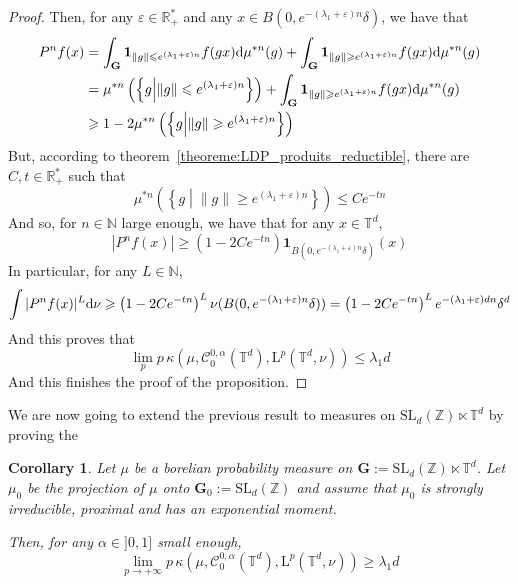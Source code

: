 \documentclass[11pt]{amsart}
\newtheorem{corollary}[theorem]{Corollary}
\theoremstyle{definition}
\theoremstyle{remark}
\numberwithin{equation}{section}
\begin{document}
\begin{proof}
Then, for any $\varepsilon \in {\mathbb R}_+^\ast$ and any $x\in B(0, e^{-(\lambda_1 +\varepsilon)n} \delta)$, we have that
\begin{align*}
P^n f(x) &= \int_{\mathbf G} {\mathbf{1}}_{\|g\|\leqslant e^{(\lambda_1 + \varepsilon)n}} f(gx) {{\rm d}}\mu^{\ast n}(g)+ \int_{\mathbf G} {\mathbf{1}}_{\|g\|\geqslant e^{(\lambda_1 + \varepsilon)n}} f(gx) {{\rm d}}\mu^{\ast n}(g) \\
&= \mu^{\ast n}\left(\left\{ g\middle| \|g\|\leqslant e^{(\lambda_1 + \varepsilon)n} \right\}\right) +  \int_{\mathbf G} {\mathbf{1}}_{\|g\|\geqslant e^{(\lambda_1 + \varepsilon)n}} f(gx) {{\rm d}}\mu^{\ast n}(g) \\
& \geqslant 1 - 2 \mu^{\ast n}\left(\left\{ g\middle| \|g\|\geqslant e^{(\lambda_1 + \varepsilon)n} \right\}\right)
\end{align*}
But, according to theorem~\ref{theoreme:LDP_produits_reductible}, there are $C,t\in {\mathbb R}_+^\ast$ such that
\[
\mu^{\ast n}\left(\left\{ g\middle| \|g\|\geqslant e^{(\lambda_1 + \varepsilon)n} \right\}\right) \leqslant Ce^{-tn}
\]
And so, for $n\in{\mathbb N}$ large enough, we have that for any $x\in {\mathbb T}^d$,
\[
|P^n f(x)| \geqslant \left(1-2Ce^{-tn}\right) {\mathbf{1}}_{B(0,e^{-(\lambda_1 + \varepsilon)n}\delta)}(x)
\]
In particular, for any $L\in {\mathbb N}$,
\[
\int |P^n f(x)|^L {{\rm d}}\nu \geqslant \left( 1-2Ce^{-tn} \right)^L \nu(B(0, e^{-(\lambda_1 + \varepsilon)n}\delta)) =  \left( 1-2Ce^{-tn} \right)^L e^{-(\lambda_1 + \varepsilon)dn} \delta^d
\]
And this proves that
\[
\lim_p  p\, \kappa\left(\mu,\mathcal{C}^{0,\alpha}_0\left({\mathbb T}^d\right), \mathrm{L}^p\left({\mathbb T}^d,\nu\right) \right) \leqslant \lambda_1 d
\]
And this finishes the proof of the proposition.
\end{proof}

We are now going to extend the previous result to measures on $\mathrm{SL}_d({\mathbb Z}) \ltimes {\mathbb T}^d$ by proving the
\begin{corollary}\label{coro:ts}
Let $\mu$ be a borelian probability measure on ${\mathbf G}:=\mathrm{SL}_d({\mathbb Z}) \ltimes {\mathbb T}^d$. Let $\mu_0$ be the projection of $\mu$ onto ${\mathbf G}_0:=\mathrm{SL}_d({\mathbb Z})$ and assume that $\mu_0$ is strongly irreducible, proximal and has an exponential moment.

Then, for any $\alpha \in ]0,1]$ small enough,
\[
\lim_{p\to+\infty}  p\, \kappa\left(\mu,\mathcal{C}^{0,\alpha}_0\left({\mathbb T}^d\right), \mathrm{L}^p\left({\mathbb T}^d,\nu\right) \right) \geqslant \lambda_1 d
\]
\end{corollary}
\end{document}
